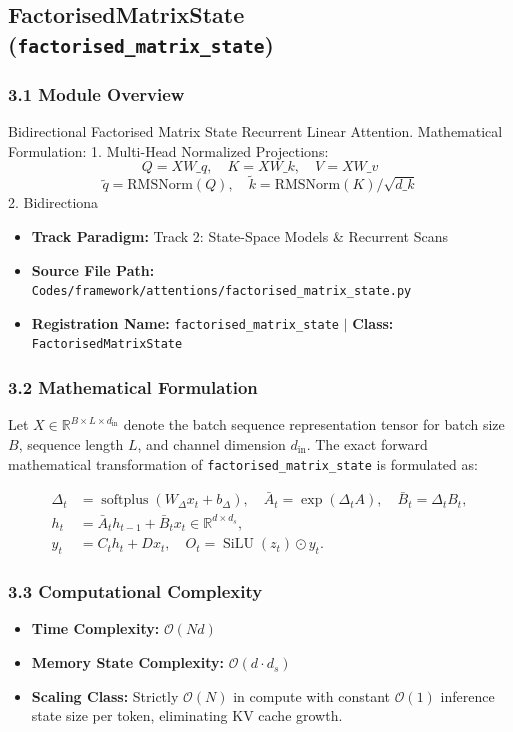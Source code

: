\subsection{FactorisedMatrixState (\texttt{factorised\_matrix\_state})}
\label{sec:app_module_factorised_matrix_state}

\subsubsection*{3.1 Module Overview}
Bidirectional Factorised Matrix State Recurrent Linear Attention.  Mathematical Formulation:     1. Multi-Head Normalized Projections:        $$Q = X W\_q, \quad K = X W\_k, \quad V = X W\_v$$        $$\tilde{q} = \text{RMSNorm}(Q), \quad \tilde{k} = \text{RMSNorm}(K) / \sqrt{d\_k}$$     2. Bidirectiona
\begin{itemize}
    \item \textbf{Track Paradigm:} Track 2: State-Space Models & Recurrent Scans
    \item \textbf{Source File Path:} \texttt{Codes/framework/attentions/factorised\_matrix\_state.py}
    \item \textbf{Registration Name:} \texttt{factorised\_matrix\_state} $\mid$ \textbf{Class:} \texttt{FactorisedMatrixState}
\end{itemize}

\subsubsection*{3.2 Mathematical Formulation}
Let $X \in \mathbb{R}^{B \times L \times d_{\text{in}}}$ denote the batch sequence representation tensor for batch size $B$, sequence length $L$, and channel dimension $d_{\text{in}}$. The exact forward mathematical transformation of \texttt{factorised\_matrix\_state} is formulated as:

\begin{align}
\Delta_t &= \operatorname{softplus}(W_\Delta x_t + b_\Delta), \quad \bar{A}_t = \exp(\Delta_t A), \quad \bar{B}_t = \Delta_t B_t, \\
h_t &= \bar{A}_t h_{t-1} + \bar{B}_t x_t \in \mathbb{R}^{d \times d_s}, \\
y_t &= C_t h_t + D x_t, \quad O_t = \operatorname{SiLU}(z_t) \odot y_t.
\end{align}


\subsubsection*{3.3 Computational Complexity}
\begin{itemize}
    \item \textbf{Time Complexity:} $\mathcal{O}(N d)$
    \item \textbf{Memory State Complexity:} $\mathcal{O}(d \cdot d_s)$
    \item \textbf{Scaling Class:} Strictly $\mathcal{O}(N)$ in compute with constant $\mathcal{O}(1)$ inference state size per token, eliminating KV cache growth.
\end{itemize}


